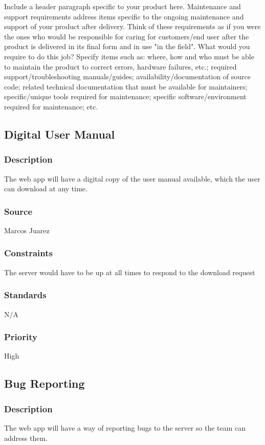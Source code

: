 Include a header paragraph specific to your product here. Maintenance and support requirements address items specific to the ongoing maintenance and support of your product after delivery. Think of these requirements as if you were the ones who would be responsible for caring for customers/end user after the product is delivered in its final form and in use "in the field". What would you require to do this job? Specify items such as: where, how and who must be able to maintain the product to correct errors, hardware failures, etc.; required support/troubleshooting manuals/guides; availability/documentation of source code; related technical documentation that must be available for maintainers; specific/unique tools required for maintenance; specific software/environment required for maintenance; etc.

\subsection{Digital User Manual}
\subsubsection{Description}
The web app will have a digital copy of the user manual available, which the user can download at any time.
\subsubsection{Source}
Marcos Juarez
\subsubsection{Constraints}
The server would have to be up at all times to respond to the download request
\subsubsection{Standards}
N/A
\subsubsection{Priority}
High

\subsection{Bug Reporting}
\subsubsection{Description}
The web app will have a way of reporting bugs to the server so the team can address them.
